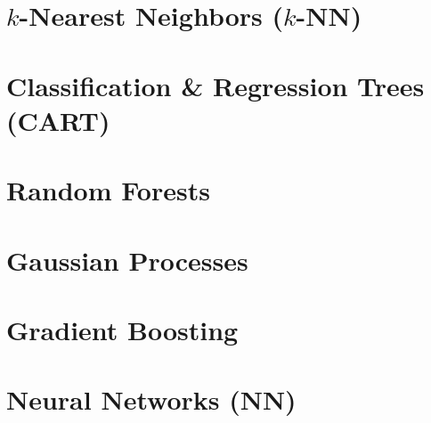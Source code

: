 \section{$k$-Nearest Neighbors ($k$-NN)}


\section{Classification \& Regression Trees (CART)}


\section{Random Forests}


\section{Gaussian Processes}


\section{Gradient Boosting}


\section{Neural Networks (NN)}


\endlecture

